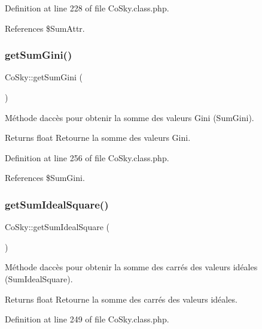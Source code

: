 Definition at line 228 of file Co\+Sky.\+class.\+php.



References \$\+Sum\+Attr.

\mbox{\label{class_co_sky_a37c6dc46ab3c4f8ce8577f90cbd60981}} 
\subsubsection{\texorpdfstring{get\+Sum\+Gini()}{getSumGini()}}
{\footnotesize\ttfamily Co\+Sky\+::get\+Sum\+Gini (\begin{DoxyParamCaption}{ }\end{DoxyParamCaption})}

Méthode d\textquotesingle{}accès pour obtenir la somme des valeurs Gini (Sum\+Gini).

\begin{DoxyReturn}{Returns}
float Retourne la somme des valeurs Gini. 
\end{DoxyReturn}


Definition at line 256 of file Co\+Sky.\+class.\+php.



References \$\+Sum\+Gini.

\mbox{\label{class_co_sky_a3cbc22af0edf7355d1b397d10e6ea05c}} 
\subsubsection{\texorpdfstring{get\+Sum\+Ideal\+Square()}{getSumIdealSquare()}}
{\footnotesize\ttfamily Co\+Sky\+::get\+Sum\+Ideal\+Square (\begin{DoxyParamCaption}{ }\end{DoxyParamCaption})}

Méthode d\textquotesingle{}accès pour obtenir la somme des carrés des valeurs idéales (Sum\+Ideal\+Square).

\begin{DoxyReturn}{Returns}
float Retourne la somme des carrés des valeurs idéales. 
\end{DoxyReturn}


Definition at line 249 of file Co\+Sky.\+class.\+php.



